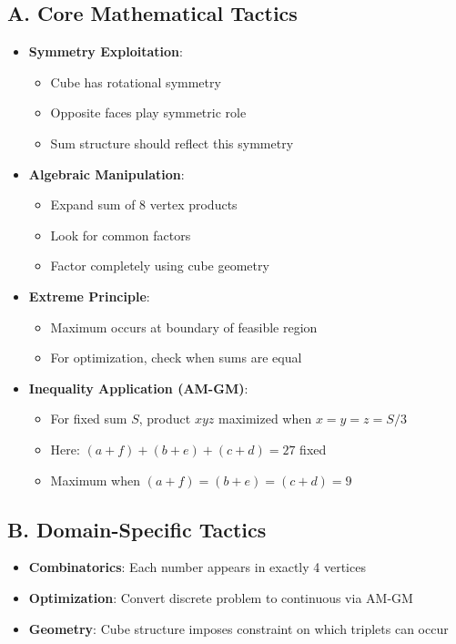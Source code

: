 \documentclass[]{article}
\begin{document}
\begin{tacticalbox}
\subsection*{A. Core Mathematical Tactics}
\begin{itemize}[leftmargin=*]
    \item \textbf{Symmetry Exploitation}:
    \begin{itemize}
        \item Cube has rotational symmetry
        \item Opposite faces play symmetric role
        \item Sum structure should reflect this symmetry
    \end{itemize}
    \item \textbf{Algebraic Manipulation}:
    \begin{itemize}
        \item Expand sum of 8 vertex products
        \item Look for common factors
        \item Factor completely using cube geometry
    \end{itemize}
    \item \textbf{Extreme Principle}:
    \begin{itemize}
        \item Maximum occurs at boundary of feasible region
        \item For optimization, check when sums are equal
    \end{itemize}
    \item \textbf{Inequality Application (AM-GM)}:
    \begin{itemize}
        \item For fixed sum $S$, product $xyz$ maximized when $x=y=z=S/3$
        \item Here: $(a+f)+(b+e)+(c+d) = 27$ fixed
        \item Maximum when $(a+f) = (b+e) = (c+d) = 9$
    \end{itemize}
\end{itemize}

\subsection*{B. Domain-Specific Tactics}
\begin{itemize}[leftmargin=*]
    \item \textbf{Combinatorics}: Each number appears in exactly 4 vertices
    \item \textbf{Optimization}: Convert discrete problem to continuous via AM-GM
    \item \textbf{Geometry}: Cube structure imposes constraint on which triplets can occur
\end{itemize}


\end{tacticalbox}
\end{document}
